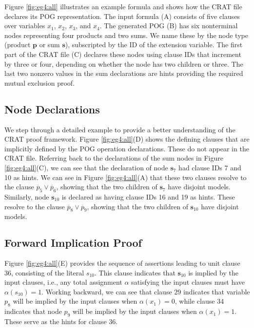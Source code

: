 \documentclass[letterpaper,USenglish,cleveref, autoref, thm-restate]{lipics-v2021}
\newcommand{\obar}[1]{\overline{#1}}
\newcommand{\assign}{\alpha}
\newcommand{\makenode}[1]{\mathbf{#1}}
\newcommand{\nodes}{\makenode{s}}
\newcommand{\nodep}{\makenode{p}}
\begin{document}
Figure \ref{fig:eg4:all} illustrates an example formula and shows how
the CRAT file declares its POG representation.  The input formula (A)
consists of five clauses over variables $x_1$, $x_2$, $x_3$, and
$x_4$.  The generated POG (B) has six nonterminal nodes representing
four products and two sums.  We name these by the node
type (product $\nodep$ or sum $\nodes$), subscripted by the ID of the
extension variable.
  The first part of the CRAT file (C) declares
these nodes using clause IDs that increment by three or four,
depending on whether the node has two children or three.  The last two
nonzero values in the sum declarations are hints providing the
required mutual exclusion proof.

\subsection{Node Declarations}

We step through a detailed example to provide a better understanding of the CRAT proof framework.
Figure
\ref{fig:eg4:all}(D) shows the defining clauses that are implicitly
defined by the POG operation declarations.  These do not appear in the
CRAT file.  Referring back to the declarations of the sum nodes in
Figure \ref{fig:eg4:all}(C), we can see that the declaration of node
$\nodes_7$ had clause IDs 7 and 10 as hints.  We can see in Figure
\ref{fig:eg4:all}(A) that these two clauses resolve to the clause
$\obar{p}_5 \lor \obar{p}_6$, showing that the two children of $\nodes_7$
have disjoint models.  Similarly, node $\nodes_{10}$ is declared as having
clause IDs 16 and 19 as hints.  These resolve to the clause
$\obar{p}_8 \lor \obar{p}_9$, showing that the two children of
$\nodes_{10}$ have disjoint models.

\subsection{Forward Implication Proof}

Figure \ref{fig:eg4:all}(E) provides the sequence of assertions
leading to unit clause 36, consisting of the literal $s_{10}$.  This clause indicates that $\nodes_{10}$ is implied by the input clauses, i.e.,
any total assignment $\assign$
satisfying the input clauses must have $\assign(s_{10}) = 1$.
Working backward, we can see that
clause 29 indicates that variable $p_8$ will be implied by the input
clauses when $\assign(x_1) = 0$, while clause 34 indicates that node $p_9$ will
be implied by the input clauses when $\assign(x_1) = 1$.  These serve as the
hints for clause 36.
\end{document}
